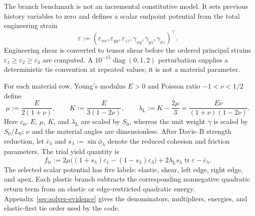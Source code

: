 The branch benchmark is not an incremental constitutive model. It sets previous
history variables to zero and defines a scalar endpoint potential from the
total engineering strain
\begin{equation}
  \varepsilon
  :=(\varepsilon_{xx},\varepsilon_{yy},\varepsilon_{zz},
     \gamma_{xy},\gamma_{yz},\gamma_{xz})^\top.
  \label{eq:plasticity3d-engineering-strain}
\end{equation}
Engineering shear is converted to tensor shear before the ordered principal
strains $\varepsilon_1\ge\varepsilon_2\ge\varepsilon_3$ are computed. A
$10^{-15}\operatorname{diag}(0,1,2)$ perturbation supplies a deterministic tie
convention at repeated values; it is not a material parameter.

For each material row, Young's modulus $E>0$ and Poisson ratio
$-1<\nu<1/2$ define
\begin{equation}
  \mu:=\frac{E}{2(1+\nu)},
  \qquad
  K:=\frac{E}{3(1-2\nu)},
  \qquad
  \lambda_{\mathrm L}:=K-\frac{2\mu}{3}
  =\frac{E\nu}{(1+\nu)(1-2\nu)}.
  \label{eq:plasticity3d-elastic-moduli}
\end{equation}
Here $c_0$, $E$, $\mu$, $K$, and $\lambda_{\mathrm L}$ are scaled by $S_0$,
whereas the unit weight $\gamma$ is scaled by $S_0/L_0$; $\nu$ and the
material angles are dimensionless.
After Davis--B strength reduction, let $\bar c_\lambda$ and
$s_\lambda:=\sin\phi_\lambda$ denote the reduced cohesion and friction
parameters. The trial yield quantity is
\begin{equation}
  f_{\mathrm{tr}}
  :=2\mu\bigl((1+s_\lambda)\varepsilon_1
       -(1-s_\lambda)\varepsilon_3\bigr)
    +2\lambda_{\mathrm L}s_\lambda\operatorname{tr}\varepsilon
    -\bar c_\lambda.
  \label{eq:plasticity3d-trial-function}
\end{equation}
The selected scalar potential has five labels: elastic, shear, left edge,
right edge, and apex. Each plastic branch subtracts the corresponding
nonnegative quadratic return term from an elastic or edge-restricted quadratic
energy. Appendix~\ref{sec:solver-evidence} gives the denominators,
multipliers, energies, and elastic-first tie order used by the code.

